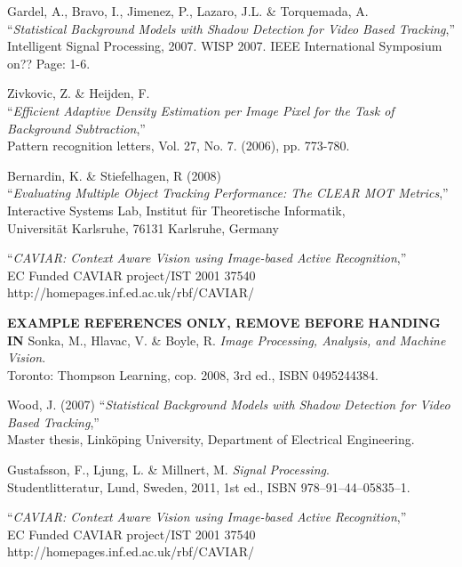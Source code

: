 \begin{thebibliography}{9}

	Gardel, A., Bravo, I., Jimenez, P., Lazaro, J.L. \& Torquemada, A.\\
	``\textit{Statistical Background Models with Shadow Detection for Video Based Tracking},''\\ Intelligent Signal Processing, 2007. WISP 2007. IEEE International Symposium on?? Page: 1-6.
	
	Zivkovic, Z. \& Heijden, F.\\
	``\textit{Efficient Adaptive Density Estimation per Image Pixel for the Task of Background Subtraction},''\\
	Pattern recognition letters, Vol. 27, No. 7. (2006), pp. 773-780.

	Bernardin, K. \& Stiefelhagen, R (2008)\\
	``\textit{Evaluating Multiple Object Tracking Performance: The CLEAR MOT Metrics},''\\
	Interactive Systems Lab, Institut für Theoretische Informatik,\\
	Universität Karlsruhe, 76131 Karlsruhe, Germany
	
	``\textit{CAVIAR: Context Aware Vision using Image-based Active Recognition},''\\
	EC Funded CAVIAR project/IST 2001 37540\\
	http://homepages.inf.ed.ac.uk/rbf/CAVIAR/
	
\vspace{2cm}
\LARGE{\textbf{EXAMPLE REFERENCES ONLY, REMOVE BEFORE HANDING IN}}
\normalsize
{}
	Sonka, M., Hlavac, V. \& Boyle, R. 
	\emph{Image Processing, Analysis, and Machine Vision}.\\
	Toronto: Thompson Learning,
	cop. 2008, 3rd ed.,
	ISBN 0495244384.
	
	Wood, J. (2007)
	``\textit{Statistical Background Models with Shadow Detection for Video Based Tracking},''\\
	Master thesis, Linköping University, Department of Electrical Engineering.	

	Gustafsson, F., Ljung, L. \& Millnert, M.
	\emph{Signal Processing}.\\
	Studentlitteratur, Lund, Sweden,
	2011, 1st ed.,
	ISBN 978--91--44--05835--1.



	``\textit{CAVIAR: Context Aware Vision using Image-based Active Recognition},''\\
	EC Funded CAVIAR project/IST 2001 37540\\
	http://homepages.inf.ed.ac.uk/rbf/CAVIAR/
	


\end{thebibliography}